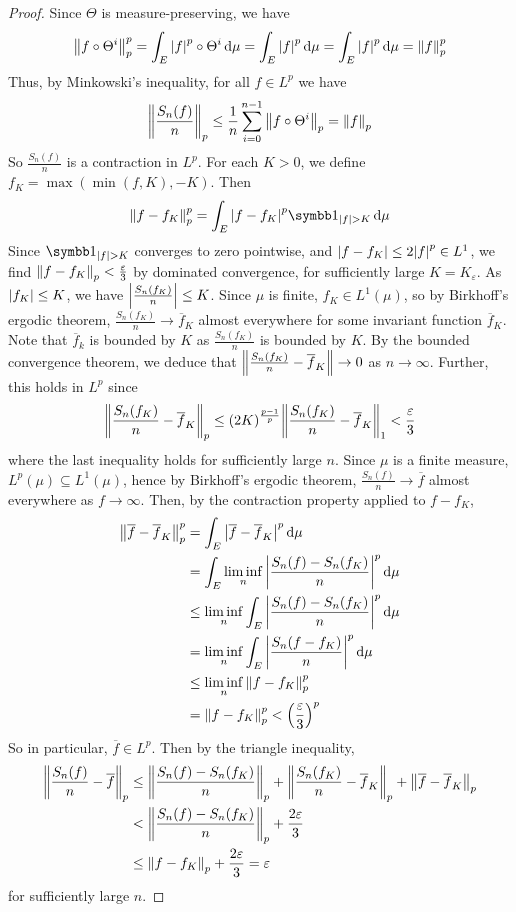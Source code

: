 \begin{proof}
	Since \( \Theta \) is measure-preserving, we have
	\[ \norm{f \circ \Theta^i}_p^p = \int_E \abs{f}^p \circ \Theta^i \dd{\mu} = \int_E \abs{f}^p \dd{\mu} = \int_E \abs{f}^p \dd{\mu} = \norm{f}_p^p \]
	Thus, by Minkowski's inequality, for all \( f \in L^p \) we have
	\[ \norm{\frac{S_n(f)}{n}}_p \leq \frac{1}{n} \sum_{i=0}^{n-1} \norm{f \circ \Theta^i}_p = \norm{f}_p \]
	So \( \frac{S_n(f)}{n} \) is a contraction in \( L^p \).
	For each \( K > 0 \), we define \( f_K = \max(\min(f, K), -K) \).
	Then
	\[ \norm{f - f_K}_p^p = \int_E \abs{f - f_K}^p \symbb 1_{\abs{f} > K} \dd{\mu} \]
	Since \( \symbb 1_{\abs{f} > K} \) converges to zero pointwise, and \( \abs{f - f_K} \leq 2\abs{f}^p \in L^1 \), we find \( \norm{f - f_K}_p < \frac{\varepsilon}{3} \) by dominated convergence, for sufficiently large \( K = K_\varepsilon \).
	As \( \abs{f_K} \leq K \), we have \( \abs{\frac{S_n(f_K)}{n}} \leq K \).
	Since \( \mu \) is finite, \( f_K \in L^1(\mu) \), so by Birkhoff's ergodic theorem, \( \frac{S_n(f_K)}{n} \to \overline f_K \) almost everywhere for some invariant function \( \overline f_K \).
	Note that \( \overline f_k \) is bounded by \( K \) as \( \frac{S_n(f_K)}{n} \) is bounded by \( K \).
	By the bounded convergence theorem, we deduce that \( \norm{\frac{S_n(f_K)}{n} - \overline f_K} \to 0 \) as \( n \to \infty \).
	Further, this holds in \( L^p \) since
	\[ \norm{\frac{S_n(f_K)}{n} - \overline f_K}_p \leq (2K)^{\frac{p-1}{p}} \norm{\frac{S_n(f_K)}{n} - \overline f_K}_1 < \frac{\varepsilon}{3} \]
	where the last inequality holds for sufficiently large \( n \).
	Since \( \mu \) is a finite measure, \( L^p(\mu) \subseteq L^1(\mu) \), hence by Birkhoff's ergodic theorem, \( \frac{S_n(f)}{n} \to \overline f \) almost everywhere as \( f \to \infty \).
	Then, by the contraction property applied to \( f - f_K \),
	\begin{align*}
		\norm{\overline f - \overline f_K}_p^p &= \int_E \abs{\overline f - \overline f_K}^p \dd{\mu} \\
		&= \int_E \liminf_n \abs{\frac{S_n(f) - S_n(f_K)}{n}}^p \dd{\mu} \\
		&\leq \liminf_n \int_E \abs{\frac{S_n(f) - S_n(f_K)}{n}}^p \dd{\mu} \\
		&= \liminf_n \int_E \abs{\frac{S_n(f - f_K)}{n}}^p \dd{\mu} \\
		&\leq \liminf_n \norm{f - f_K}_p^p \\
		&= \norm{f - f_K}_p^p < \qty(\frac{\varepsilon}{3})^p
	\end{align*}
	So in particular, \( \overline f \in L^p \).
	Then by the triangle inequality,
	\begin{align*}
			\norm{\frac{S_n(f)}{n} - \overline f}_p &\leq \norm{\frac{S_n(f) - S_n(f_K)}{n}}_p + \norm{\frac{S_n(f_K)}{n} - \overline f_K}_p + \norm{\overline f - \overline f_K}_p \\
			&< \norm{\frac{S_n(f) - S_n(f_K)}{n}}_p + \frac{2\varepsilon}{3} \\
			&\leq \norm{f - f_K}_p + \frac{2\varepsilon}{3} = \varepsilon
	\end{align*}
	for sufficiently large \( n \).
\end{proof}

